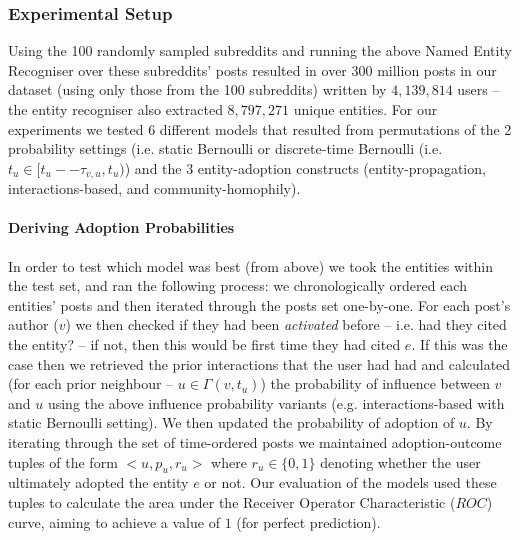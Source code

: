 \documentclass[sigconf,anonymous,review]{acmart}
\begin{document}
\subsubsection{Experimental Setup}
Using the 100 randomly sampled subreddits and running the above Named Entity Recogniser over these subreddits' posts resulted in over $300$ million posts in our dataset (using only those from the 100 subreddits) written by $4,139,814$ users -- the entity recogniser also extracted $8,797,271$ unique entities.
For our experiments we tested 6 different models that resulted from permutations of the 2 probability settings (i.e. static Bernoulli or discrete-time Bernoulli (i.e. $t_u \in [t_u -- \tau_{v,u}, t_u)$) and the 3 entity-adoption constructs (entity-propagation, interactions-based, and community-homophily).

\paragraph{Deriving Adoption Probabilities}
In order to test which model was best (from above) we took the entities within the test set, and ran the following process: we chronologically ordered each entities' posts and then iterated through the posts set one-by-one.
For each post's author ($v$) we then checked if they had been \emph{activated} before -- i.e. had they cited the entity? -- if not, then this would be first time they had cited $e$.
If this was the case then we retrieved the prior interactions that the user had had and calculated (for each prior neighbour -- $u \in \Gamma(v, t_u)$) the probability of influence between $v$ and $u$ using the above influence probability variants (e.g. interactions-based with static Bernoulli setting).
We then updated the probability of adoption of $u$.
By iterating through the set of time-ordered posts we maintained adoption-outcome tuples of the form $<u, p_u, r_u>$ where $r_u \in \{0,1\}$ denoting whether the user ultimately adopted the entity $e$ or not.
Our evaluation of the models used these tuples to calculate the area under the Receiver Operator Characteristic ($ROC$) curve, aiming to achieve a value of $1$ (for perfect prediction).
\end{document}
